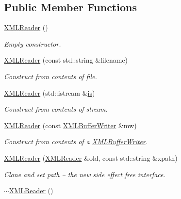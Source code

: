 \subsection*{Public Member Functions}
\begin{DoxyCompactItemize}
\item 
\mbox{\hyperlink{classADATXML_1_1XMLReader_a1934189445871612ae9b93f35e17c468}{X\+M\+L\+Reader}} ()
\begin{DoxyCompactList}\small\item\em Empty constructor. \end{DoxyCompactList}\item 
\mbox{\hyperlink{classADATXML_1_1XMLReader_a85d8af8a27febdd66251e20bd96ccc32}{X\+M\+L\+Reader}} (const std\+::string \&filename)
\begin{DoxyCompactList}\small\item\em Construct from contents of file. \end{DoxyCompactList}\item 
\mbox{\hyperlink{classADATXML_1_1XMLReader_a8025cb1c53d6ceb8a694bdbd8e1f383b}{X\+M\+L\+Reader}} (std\+::istream \&\mbox{\hyperlink{x_8cc_a81abbbdef81e25584a2eab888e643d3d}{is}})
\begin{DoxyCompactList}\small\item\em Construct from contents of stream. \end{DoxyCompactList}\item 
\mbox{\hyperlink{classADATXML_1_1XMLReader_a6829255c2dd448f4bf315f6fd0b380a1}{X\+M\+L\+Reader}} (const \mbox{\hyperlink{classADATXML_1_1XMLBufferWriter}{X\+M\+L\+Buffer\+Writer}} \&mw)
\begin{DoxyCompactList}\small\item\em Construct from contents of a \mbox{\hyperlink{classADATXML_1_1XMLBufferWriter}{X\+M\+L\+Buffer\+Writer}}. \end{DoxyCompactList}\item 
\mbox{\hyperlink{classADATXML_1_1XMLReader_aef69d83a0f47db461436fc2fd3bb7723}{X\+M\+L\+Reader}} (\mbox{\hyperlink{classADATXML_1_1XMLReader}{X\+M\+L\+Reader}} \&old, const std\+::string \&xpath)
\begin{DoxyCompactList}\small\item\em Clone and set path -- the new side effect free interface. \end{DoxyCompactList}\item 
\mbox{\hyperlink{classADATXML_1_1XMLReader_a98c4936a3366f39443113290b7bd164a}{$\sim$\+X\+M\+L\+Reader}} ()
\item 

\end{DoxyCompactItemize}
